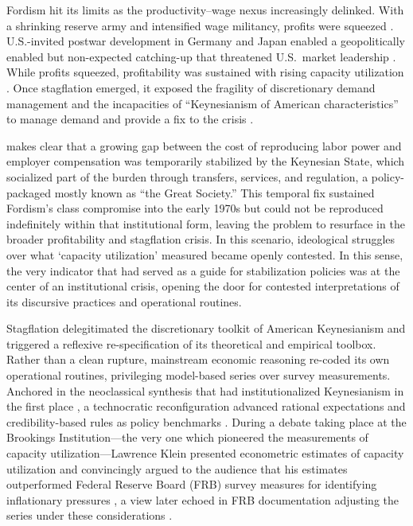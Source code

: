 \documentclass[11pt]{article}
\begin{document}
Fordism hit its limits as the productivity--wage nexus increasingly delinked. With a shrinking reserve army and intensified wage militancy, profits were squeezed \citep{weisskopf1979}. U.S.-invited postwar development in Germany and Japan enabled a geopolitically enabled but non-expected catching-up that threatened U.S.\ market leadership \citep{lipietz1987,vidal2019geriatric}. While profits squeezed, profitability was sustained with rising capacity utilization \citep{weisskopf1979,shaikh2016}. Once stagflation emerged, it exposed the fragility of discretionary demand management and the incapacities of ``Keynesianism of American characteristics'' to manage demand and provide a fix to the crisis \citep{shaikhetal1999}.

\citet{moos2021} makes clear that a growing gap between the cost of reproducing labor power and employer compensation was temporarily stabilized by the Keynesian State, which socialized part of the burden through transfers, services, and regulation, a policy-packaged mostly known as ``the Great Society.'' This temporal fix sustained Fordism's class compromise into the early 1970s but could not be reproduced indefinitely within that institutional form, leaving the problem to resurface in the broader profitability and stagflation crisis. In this scenario, ideological struggles over what `capacity utilization' measured became openly contested. In this sense, the very indicator that had served as a guide for stabilization policies was at the center of an institutional crisis, opening the door for contested interpretations of its discursive practices and operational routines.

Stagflation delegitimated the discretionary toolkit of American Keynesianism and triggered a reflexive re-specification of its theoretical and empirical toolbox. Rather than a clean rupture, mainstream economic reasoning re-coded its own operational routines, privileging model-based series over survey measurements. Anchored in the neoclassical synthesis that had institutionalized Keynesianism in the first place \citep{samuelson1947,samuelson1948}, a technocratic reconfiguration advanced rational expectations and credibility-based rules as policy benchmarks \citep{johnson2024}. During a debate taking place at the Brookings Institution---the very one which pioneered the measurements of capacity utilization---Lawrence Klein presented econometric estimates of capacity utilization and convincingly argued to the audience that his estimates outperformed Federal Reserve Board (FRB) survey measures for identifying inflationary pressures \citep{kleinetal1973}, a view later echoed in FRB documentation adjusting the series under these considerations \citep{shaikh2016}.
\end{document}
